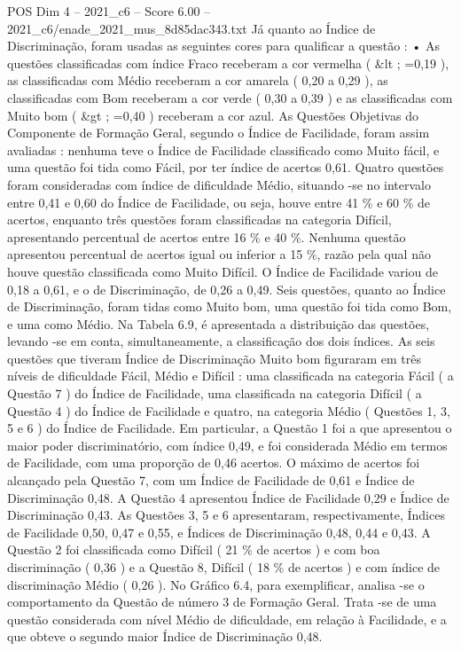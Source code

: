 \begin{textsample}{POS Dim 4 – 2021\_c6 – Score 6.00 – 2021\_c6/enade\_2021\_mus\_8d85dac343.txt}
Já quanto ao Índice de Discriminação, foram usadas as seguintes cores para qualificar a questão : • As questões classificadas com índice Fraco receberam a cor vermelha ( \&lt ; =0,19 ), as classificadas com Médio receberam a cor amarela ( 0,20 a 0,29 ), as classificadas com Bom receberam a cor verde ( 0,30 a 0,39 ) e as classificadas com Muito bom ( \&gt ; =0,40 ) receberam a cor azul.
As Questões Objetivas do Componente de Formação Geral, segundo o Índice de Facilidade, foram assim avaliadas : nenhuma teve o Índice de Facilidade classificado como Muito fácil, e uma questão foi tida como Fácil, por ter índice de acertos 0,61.
Quatro questões foram consideradas com índice de dificuldade Médio, situando -se no intervalo entre 0,41 e 0,60 do Índice de Facilidade, ou seja, houve entre 41 \% e 60 \% de acertos, enquanto três questões foram classificadas na categoria Difícil, apresentando percentual de acertos entre 16 \% e 40 \%.
Nenhuma questão apresentou percentual de acertos igual ou inferior a 15 \%, razão pela qual não houve questão classificada como Muito Difícil.
O Índice de Facilidade variou de 0,18 a 0,61, e o de Discriminação, de 0,26 a 0,49.
Seis questões, quanto ao Índice de Discriminação, foram tidas como Muito bom, uma questão foi tida como Bom, e uma como Médio.
Na Tabela 6.9, é apresentada a distribuição das questões, levando -se em conta, simultaneamente, a classificação dos dois índices.
As seis questões que tiveram Índice de Discriminação Muito bom figuraram em três níveis de dificuldade Fácil, Médio e Difícil : uma classificada na categoria Fácil ( a Questão 7 ) do Índice de Facilidade, uma classificada na categoria Difícil ( a Questão 4 ) do Índice de Facilidade e quatro, na categoria Médio ( Questões 1, 3, 5 e 6 ) do Índice de Facilidade.
Em particular, a Questão 1 foi a que apresentou o maior poder discriminatório, com índice 0,49, e foi considerada Médio em termos de Facilidade, com uma proporção de 0,46 acertos.
O máximo de acertos foi alcançado pela Questão 7, com um Índice de Facilidade de 0,61 e Índice de Discriminação 0,48.
A Questão 4 apresentou Índice de Facilidade 0,29 e Índice de Discriminação 0,43.
As Questões 3, 5 e 6 apresentaram, respectivamente, Índices de Facilidade 0,50, 0,47 e 0,55, e Índices de Discriminação 0,48, 0,44 e 0,43.
A Questão 2 foi classificada como Difícil ( 21 \% de acertos ) e com boa discriminação ( 0,36 ) e a Questão 8, Difícil ( 18 \% de acertos ) e com índice de discriminação Médio ( 0,26 ).
No Gráfico 6.4, para exemplificar, analisa -se o comportamento da Questão de número 3 de Formação Geral.
Trata -se de uma questão considerada com nível Médio de dificuldade, em relação à Facilidade, e a que obteve o segundo maior Índice de Discriminação 0,48.

\end{textsample}
